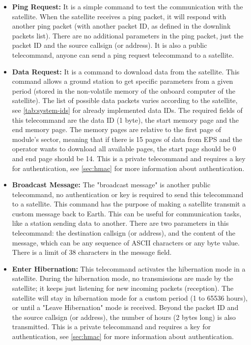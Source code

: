 \begin{itemize}
	\item \textbf{Ping Request:} It is a simple command to test the communication with the satellite. When the satellite receives a ping packet, it will respond with another ping packet (with another packet ID, as defined in the downlink packets list). There are no additional parameters in the ping packet, just the packet ID and the source callsign (or address). It is also a public telecommand, anyone can send a ping request telecommand to a satellite.
    \item \textbf{Data Request:} It is a command to download data from the satellite. This command allows a ground station to get specific parameters from a given period (stored in the non-volatile memory of the onboard computer of the satellite). The list of possible data packets varies according to the satellite, see \autoref{tab:system-ids} for already implemented data IDs. The required fields of this telecommand are the data ID (1 byte), the start memory page and the end memory page. The memory pages are relative to the first page of module's sector, meaning that if there is 15 pages of data from EPS and the operator wants to download all available pages, the start page should be 0 and end page should be 14. This is a private telecommand and requires a key for authentication, see \autoref{sec:hmac} for more information about authentication.
	\item \textbf{Broadcast Message:} The "broadcast message" is another public telecommand, no authentication or key is required to send this telecommand to a satellite. This command has the purpose of making a satellite transmit a custom message back to Earth. This can be useful for communication tasks, like a station sending data to another. There are two parameters in this telecommand: the destination callsign (or address), and the content of the message, which can be any sequence of ASCII characters or any byte value. There is a limit of 38 characters in the message field.
	\item \textbf{Enter Hibernation:} This telecommand activates the hibernation mode in a satellite. During the hibernation mode, no transmissions are made by the satellite; it keeps just listening for new incoming packets (reception). The satellite will stay in hibernation mode for a custom period (1 to 65536 hours), or until a "Leave Hibernation" mode is received. Beyond the packet ID and the source callsign (or address), the number of hours (2 bytes long) is also transmitted. This is a private telecommand and requires a key for authentication, see \autoref{sec:hmac} for more information about authentication.

\end{itemize}
